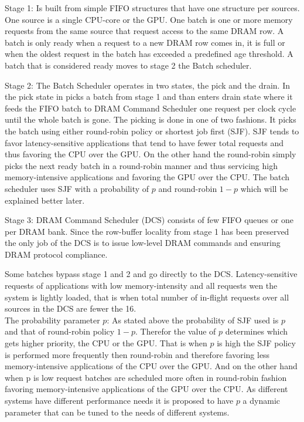 \documentclass[12pt,journal,compsoc]{IEEEtran}
\begin{document}
Stage 1: Is built from simple FIFO structures that have one structure per sources.  One source is a single CPU-core or the GPU.  One batch is one or more memory requests from the same source that request access to the same DRAM row.  A batch is only ready when a request to a new DRAM row comes in, it is full or when the oldest request in the batch has exceeded a predefined age threshold.  A batch that is considered ready moves to stage 2 the Batch scheduler.

Stage 2:  The Batch Scheduler operates in two states, the pick  and the  drain.  In the pick state in picks a batch from stage 1 and than enters drain state where it feeds the FIFO batch to DRAM Command Scheduler one request per clock cycle until the whole batch is gone.  The picking is done in one of two fashions.  It picks the batch using either round-robin policy or shortest job first (SJF).   SJF tends to favor latency-sensitive applications that tend to have fewer total requests and thus favoring the CPU over the GPU.  On the other hand the round-robin simply picks the next ready batch in a round-robin manner and thus servicing high memory-intensive applications and favoring the GPU over the CPU.  The batch scheduler uses SJF with a probability of $p$ and round-robin  $ 1 - p $ which will be explained better later.

Stage 3: DRAM Command Scheduler (DCS) consists of few FIFO queues or one per DRAM bank.  Since the row-buffer locality from stage 1 has been preserved the only job of the DCS is to issue low-level DRAM commands and ensuring DRAM protocol compliance. 

Some batches bypass stage 1 and 2 and go directly to the DCS. Latency-sensitive requests of applications with low memory-intensity and all requests wen the system is lightly loaded, that is when total number of in-flight requests over all sources in the DCS are fewer the 16.\\

The probability parameter $p$:  As stated above the probability of SJF used is $p$ and that of round-robin policy $1-p$.  Therefor the value of $p$ determines  which gets higher priority, the CPU or the
GPU.  That is when $p$ is high the SJF policy is performed more frequently then round-robin and therefore favoring less memory-intensive applications of the CPU over the GPU.  And on the other hand when p is low request batches are scheduled more often in round-robin fashion favoring memory-intensive applications of the GPU over the CPU.  As different systems have different performance needs it is proposed to have $p$ a dynamic parameter that can be tuned to the needs of different systems.\\
\end{document}
